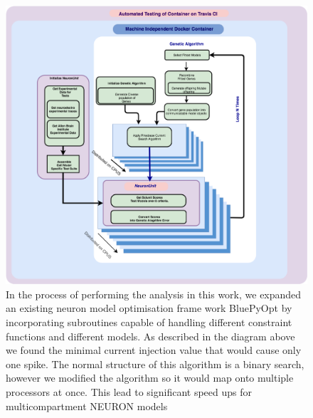 \begin{figure}    
\begin{center}
\includegraphics[width=1.2\linewidth]{figures/software_architecture}
\caption{In the process of performing the analysis in this work, we expanded an existing neuron model optimisation frame work BluePyOpt \cite{bluepyopt} by incorporating subroutines capable of handling different constraint functions and different models. As described in the diagram above we found the minimal current injection value that would cause only one spike. The normal structure of this algorithm is a binary search, however we modified the algorithm so it would map onto multiple processors at once. This lead to significant speed ups for multicompartment NEURON models}

\end{center}
\end{figure}


